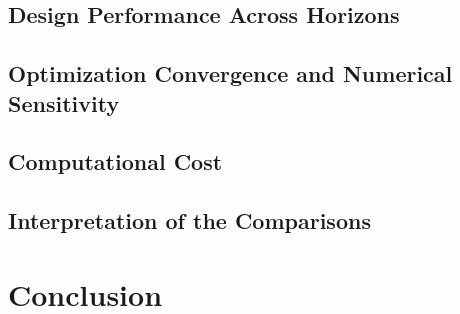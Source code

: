 \documentclass[journal]{IEEEtran}
\begin{document}
\subsection{Design Performance Across Horizons}
\subsection{Optimization Convergence and Numerical Sensitivity}
\subsection{Computational Cost}
\subsection{Interpretation of the Comparisons}

\section{Conclusion}
\label{sec:conclusion}



\end{document}
